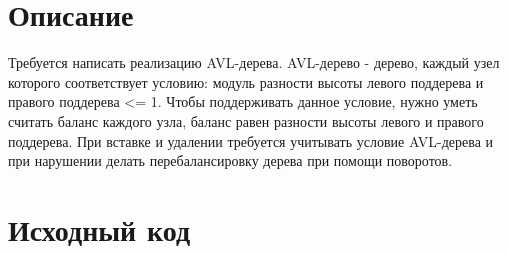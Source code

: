 \section{Описание}
Требуется написать реализацию AVL-дерева. AVL-дерево - дерево, каждый узел которого соответствует условию: модуль разности высоты 
левого поддерева и правого поддерева <= 1. Чтобы поддерживать данное условие, нужно уметь считать баланс каждого узла, 
баланс равен разности высоты левого и правого поддерева. 
При вставке и удалении требуется учитывать условие AVL-дерева и при нарушении делать перебалансировку дерева при помощи поворотов.

\pagebreak

\section{Исходный код}

